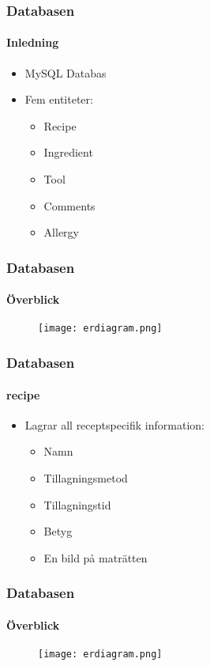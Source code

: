 
\begin{frame}
  \frametitle{Databasen}
  \framesubtitle{Inledning}
  \begin{itemize}
    \item<1-> MySQL Databas
    \item<2-> Fem entiteter:
      \begin{itemize}
      \item<3-> Recipe
      \item<4-> Ingredient
      \item<5-> Tool
      \item<6-> Comments
      \item<7-> Allergy
      \end{itemize}
  \end{itemize}
\end{frame}


\begin{frame}
  \frametitle{Databasen}
  \framesubtitle{Överblick}
  \begin{figure}[H]
        \centering 
        \texttt{[image: erdiagram.png]} 
        \label{fig:erdiagram}
\end{figure}
\end{frame}


\begin{frame}
  \frametitle{Databasen}
  \framesubtitle{recipe}
  \begin{itemize}
    \item<1-> Lagrar all receptspecifik information:
      \begin{itemize}
        \item Namn 
        \item Tillagningsmetod
        \item Tillagningstid
        \item Betyg
        \item En bild på maträtten
      \end{itemize}
 \end{itemize}
\end{frame}


\begin{frame}
  \frametitle{Databasen}
  \framesubtitle{Överblick}
  \begin{figure}[H]
    \centering 
    \texttt{[image: erdiagram.png]} 
    \label{fig:erdiagram}
  \end{figure}
\end{frame}

